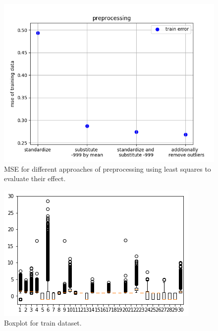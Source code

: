 \documentclass[10pt,conference,compsocconf]{IEEEtran}
\begin{document}
\begin{figure}[htbp]
	\centering
	\includegraphics[width=\columnwidth]{preprocessing.png}
	\caption{MSE for different approaches of preprocessing using least squares to evaluate their effect.}
	\vspace{-3mm}
	\label{fig:prepro}
\end{figure}


\begin{figure}
	\centering
	\includegraphics[width=\columnwidth]{trainBoxPlot.png}
	\caption{Boxplot for train dataset. }
	\vspace{-3mm}
	\label{fig:boxplottrainset}
\end{figure}
\end{document}
